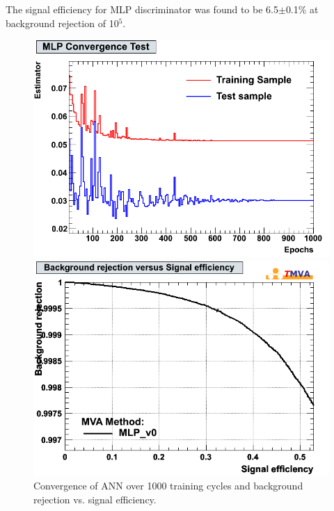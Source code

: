 \documentclass[a4paper]{jpconf}
\begin{document}
The signal efficiency for MLP discriminator was found to be  6.5$\pm$0.1\% at background rejection of 10$^5$.
\begin{figure}[h]
 \begin{minipage}{8.1cm}
\includegraphics[width=1.0\textwidth]{images/MLPConvergenceTest.png}
\end{minipage}
 \hfill
\begin{minipage}{8.1cm}

\includegraphics[width=1.0\textwidth]{images/roc.png}
\end{minipage}
\caption{Convergence of ANN over 1000 training cycles and background rejection vs. signal efficiency.}
\label{fig:nn}
\end{figure}
\end{document}
